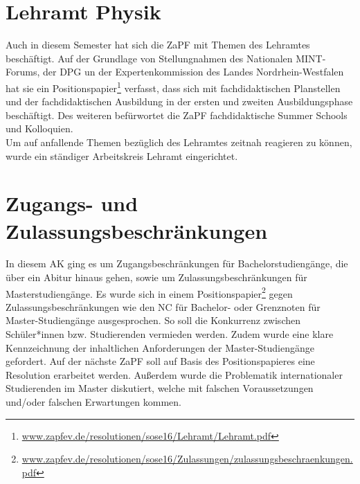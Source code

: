 \section*{Lehramt Physik}
Auch in diesem Semester hat sich die ZaPF mit Themen des Lehramtes beschäftigt. 
Auf der Grundlage von Stellungnahmen des Nationalen MINT-Forums, der DPG un der 
Expertenkommission des Landes Nordrhein-Westfalen hat sie ein Positionspapier\footnote{\href{http://www.zapfev.de/resolutionen/sose16/Lehramt/Lehramt.pdf}{\url{www.zapfev.de/resolutionen/sose16/Lehramt/Lehramt.pdf}}} verfasst, 
dass sich mit fachdidaktischen Planstellen und der fachdidaktischen Ausbildung in 
der ersten und zweiten Ausbildungsphase beschäftigt. Des weiteren befürwortet die ZaPF 
fachdidaktische Summer Schools und Kolloquien. \\
Um auf anfallende Themen bezüglich des Lehramtes zeitnah reagieren zu können, wurde ein ständiger Arbeitskreis Lehramt eingerichtet. 


\section*{Zugangs- und Zulassungsbeschränkungen}
In diesem AK ging es um Zugangsbeschränkungen für Bachelorstudiengänge, 
die über ein Abitur hinaus gehen, sowie um Zulassungsbeschränkungen für Masterstudiengänge.
Es wurde sich in einem Positionspapier\footnote{\href{http://www.zapfev.de/resolutionen/sose16/Zulassungen/zulassungsbeschraenkungen.pdf}{\url{www.zapfev.de/resolutionen/sose16/Zulassungen/zulassungsbeschraenkungen.pdf}}} gegen Zulassungsbeschränkungen wie den 
NC für Bachelor- oder Grenznoten für Master-Studiengänge ausgesprochen. 
So soll die Konkurrenz zwischen Schüler*innen bzw. Studierenden vermieden werden. 
Zudem wurde eine klare Kennzeichnung der inhaltlichen Anforderungen der Master-Studiengänge gefordert. 
Auf der nächste ZaPF soll auf Basis des Positionspapieres eine Resolution erarbeitet werden. 
Außerdem wurde die Problematik internationaler Studierenden im Master  diskutiert, 
welche mit falschen Voraussetzungen und/oder falschen Erwartungen kommen. \\


